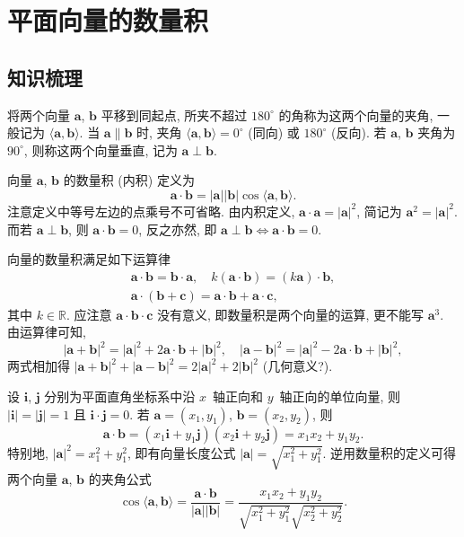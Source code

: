 
\section{平面向量的数量积}

\subsection{知识梳理}
将两个向量 $\bm{a}$, $\bm{b}$ 平移到同起点, 
所夹不超过 $180^\circ$ 的角称为这两个向量的夹角, 一般记为 
$\langle\bm{a},\bm{b}\rangle$. 当 $\bm{a}\parallel\bm{b}$ 时, 
夹角 $\langle\bm{a},\bm{b}\rangle= 0^\circ$ (同向) 或 $180^\circ$ (反向).
若 $\bm{a}$, $\bm{b}$ 夹角为 $90^\circ$, 则称这两个向量垂直,
记为 $\bm{a}\perp\bm{b}$.

向量 $\bm{a}$, $\bm{b}$ 的数量积 (内积) 定义为 
\[\bm{a}\cdot\bm{b}
    = |\bm{a}||\bm{b}|\cos\langle\bm{a},\bm{b}\rangle.\]
注意定义中等号左边的点乘号不可省略. 由内积定义, 
$\bm{a}\cdot\bm{a}= |\bm{a}|^2$, 简记为 $\bm{a}^2= |\bm{a}|^2$. 
而若 $\bm{a}\perp\bm{b}$, 则 $\bm{a}\cdot\bm{b}= 0$,
反之亦然, 即 $\bm{a}\perp\bm{b}\Leftrightarrow \bm{a}\cdot\bm{b}=0$.

向量的数量积满足如下运算律
\[\begin{gathered}
    \bm{a}\cdot\bm{b}= \bm{b}\cdot\bm{a},\quad
    k(\bm{a}\cdot\bm{b})= (k\bm{a})\cdot\bm{b},\\
    \bm{a}\cdot(\bm{b}+\bm{c})
    = \bm{a}\cdot\bm{b}+ \bm{a}\cdot\bm{c},
\end{gathered}\]
其中 $k\in\mathbb{R}$. 应注意 $\bm{a}\cdot\bm{b}\cdot\bm{c}$ 没有意义,
即数量积是两个向量的运算, 更不能写 $\bm{a}^3$. 由运算律可知,
\[|\bm{a}+\bm{b}|^2= |\bm{a}|^2+2\bm{a}\cdot\bm{b}+|\bm{b}|^2,\quad
    |\bm{a}-\bm{b}|^2= |\bm{a}|^2-2\bm{a}\cdot\bm{b}+|\bm{b}|^2,\]
两式相加得 $|\bm{a}+\bm{b}|^2+ |\bm{a}-\bm{b}|^2= 2|\bm{a}|^2+2|\bm{b}|^2$
(几何意义?).

设 $\bm{i}$, $\bm{j}$ 分别为平面直角坐标系中沿 $x$~轴正向和 $y$~轴正向的单位向量, 
则 $|\bm{i}|=|\bm{j}|=1$ 且 $\bm{i}\cdot\bm{j}=0$.
若 $\bm{a}=(x_1,y_1)$, $\bm{b}=(x_2,y_2)$, 则
\[\bm{a}\cdot\bm{b}
    = (x_1\bm{i}+y_1\bm{j})(x_2\bm{i}+y_2\bm{j})
    = x_1x_2+y_1y_2.\]
特别地, $|\bm{a}|^2= x_1^2+y_1^2$, 
即有向量长度公式 $|\bm{a}|= \sqrt{x_1^2+y_1^2}$. 
逆用数量积的定义可得两个向量 $\bm{a}$, $\bm{b}$ 的夹角公式
\[\cos\langle\bm{a},\bm{b}\rangle
    = \frac{\bm{a}\cdot\bm{b}}{|\bm{a}||\bm{b}|}
    = \frac{x_1x_2+y_1y_2}{\sqrt{x_1^2+y_1^2}\sqrt{x_2^2+y_2^2}}.\]



